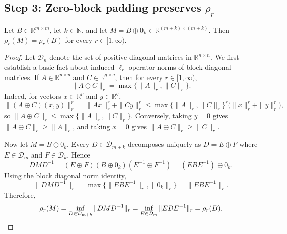 \subsection*{Step 3: Zero-block padding preserves $\rho_r$}

\begin{lemma}\label{lem:zero-padding}
Let $B \in \mathbb{R}^{m \times m}$, let $k \in \mathbb{N}$, and let $M = B \oplus 0_k \in \mathbb{R}^{(m+k)\times(m+k)}$. Then $\rho_r(M)=\rho_r(B)$ for every $r \in [1,\infty)$.
\end{lemma}

\begin{proof}
Let $\mathcal{D}_n$ denote the set of positive diagonal matrices in $\mathbb{R}^{n \times n}$. We first establish a basic fact about induced $\ell_r$ operator norms of block diagonal matrices. If $A \in \mathbb{R}^{p \times p}$ and $C \in \mathbb{R}^{q \times q}$, then for every $r \in [1,\infty)$,
\[
\|A \oplus C\|_r=\max\{\|A\|_r,\|C\|_r\}.
\]
Indeed, for vectors $x \in \mathbb{R}^p$ and $y \in \mathbb{R}^q$,
\[
\|(A \oplus C)(x,y)\|_r^r = \|Ax\|_r^r+\|Cy\|_r^r \le \max\{\|A\|_r,\|C\|_r\}^r\bigl(\|x\|_r^r+\|y\|_r^r\bigr),
\]
so $\|A \oplus C\|_r \le \max\{\|A\|_r,\|C\|_r\}$. Conversely, taking $y=0$ gives $\|A \oplus C\|_r \ge \|A\|_r$, and taking $x=0$ gives $\|A \oplus C\|_r \ge \|C\|_r$.

Now let $M=B \oplus 0_k$. Every $D \in \mathcal{D}_{m+k}$ decomposes uniquely as $D=E \oplus F$ where $E \in \mathcal{D}_m$ and $F \in \mathcal{D}_k$. Hence
\[
DMD^{-1} = (E \oplus F)(B \oplus 0_k)(E^{-1}\oplus F^{-1}) = (EBE^{-1}) \oplus 0_k.
\]
Using the block diagonal norm identity,
\[
\|DMD^{-1}\|_r = \max\{\|EBE^{-1}\|_r,\|0_k\|_r\} = \|EBE^{-1}\|_r.
\]
Therefore,
\[
\rho_r(M) = \inf_{D \in \mathcal{D}_{m+k}} \|DMD^{-1}\|_r = \inf_{E \in \mathcal{D}_m} \|EBE^{-1}\|_r = \rho_r(B). \qedhere
\]
\end{proof}
